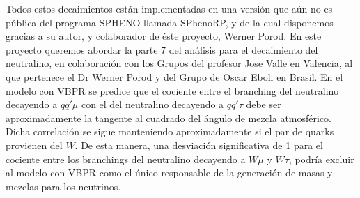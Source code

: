 Todos estos decaimientos están implementadas en una versión que aún no
es pública del programa SPHENO %
llamada
SPhenoRP, y de la cual disponemos gracias a su autor, y colaborador de
éste proyecto, Werner Porod. En este proyecto queremos abordar la
parte 7 del análisis para el decaimiento del neutralino, en
colaboración con los Grupos del profesor Jose Valle en Valencia, al
que pertenece el Dr Werner Porod y del Grupo de Oscar Eboli en Brasil.
En el modelo con VBPR se predice que el cociente entre el branching
del neutralino decayendo a $qq'\mu$ con el del neutralino decayendo a
$qq'\tau$ debe ser aproximadamente la tangente al cuadrado del ángulo de
mezcla atmosférico. Dicha correlación se sigue manteniendo
aproximadamente si el par de quarks provienen del $W$. De esta manera,
una desviación significativa de 1 para el cociente entre los
branchings del neutralino decayendo a $W\mu$ y $W\tau$, podría excluir al
modelo con VBPR como el único responsable de la generación de masas y
mezclas para los neutrinos.

